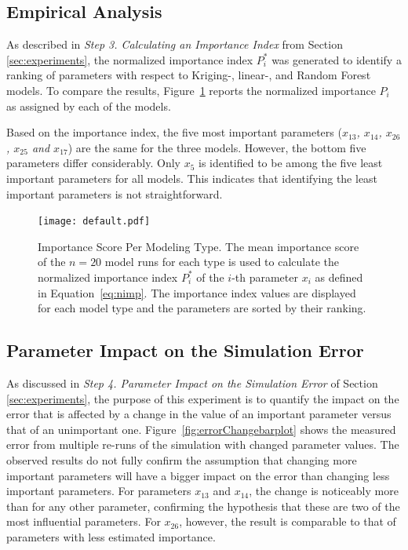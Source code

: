 \documentclass[conference]{IEEEtran}
\begin{document}
\subsection{Empirical Analysis}
As described in \emph{Step 3. Calculating an Importance Index} from Section \ref{sec:experiments}, 
the normalized importance index $P^{\ast}_i$ was generated to identify a ranking of parameters with respect to Kriging-, linear-, and Random Forest models.
To compare the results, Figure~\ref{fig:importanceByType} reports the normalized importance $P_{i}$ as assigned by each of the models.

Based on the importance index, the five most important parameters (\emph{$x_{13}$, $x_{14}$, $x_{26}$, $x_{25}$ and $x_{17}$}) are the same for the three models. However, the bottom five parameters differ considerably. Only \emph{$x_{5}$} is identified to be among the five least important  parameters for all models. 
This indicates that identifying the least important parameters is not straightforward.

\begin{figure}
  \centering
  \texttt{[image: default.pdf]}
  \caption{Importance Score Per Modeling Type. The mean importance score of the $n=20$ model runs for each type is used to calculate the normalized importance index $P^{\ast}_i$ of the $i$-th parameter $x_i$ as defined in Equation~\ref{eq:nimp}. The importance index values are displayed for each model type and the parameters are sorted by their ranking.}
\label{fig:importanceByType}
\end{figure}

\subsection{Parameter Impact on the Simulation Error}

As discussed in \emph{Step 4. Parameter Impact on the Simulation Error} of Section \ref{sec:experiments}, the purpose of this experiment is to quantify the impact on the error that is affected by a change in the value of an important parameter versus that of an unimportant one. Figure~\ref{fig:errorChangebarplot} shows the measured error from multiple re-runs of the simulation with changed parameter values. 
The observed results do not fully confirm the assumption that changing more important parameters will have a bigger impact on the error than changing less important parameters. For parameters \emph{$x_{13}$} and \emph{$x_{14}$}, the change is noticeably more than for any other parameter, 
confirming the hypothesis that these are two of the most influential parameters. For \emph{$x_{26}$}, however, the result is comparable to that of parameters with less estimated importance.
\end{document}
